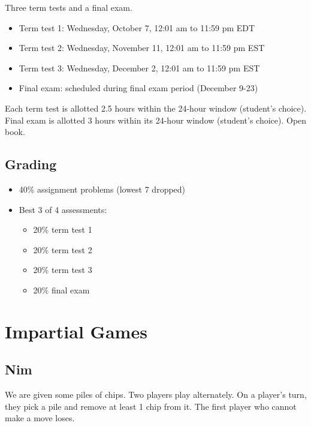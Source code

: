 \documentclass[12pt,letterpaper]{report}
\begin{document}
Three term tests and a final exam.
\begin{itemize}
  \item Term test 1: Wednesday, October 7, 12:01 am to 11:59 pm EDT
  \item Term test 2: Wednesday, November 11, 12:01 am to 11:59 pm EST
  \item Term test 3: Wednesday, December 2, 12:01 am to 11:59 pm EST
  \item Final exam: scheduled during final exam period (December 9-23)
\end{itemize}
Each term test is allotted 2.5 hours within the 24-hour window (student's choice).
Final exam is allotted 3 hours within its 24-hour window (student's choice).
Open book.

\subsection{Grading}

\begin{itemize}
  \item 40\% assignment problems (lowest 7 dropped)
  \item Best 3 of 4 assessments:
    \begin{itemize}
      \item 20\% term test 1
      \item 20\% term test 2
      \item 20\% term test 3
      \item 20\% final exam
    \end{itemize}
\end{itemize}


\section{Impartial Games}

\subsection{Nim}

We are given some piles of chips.
Two players play alternately.
On a player's turn, they pick a pile and remove at least 1 chip from it.
The first player who cannot make a move loses.
\end{document}
